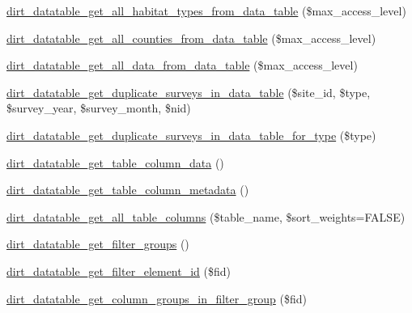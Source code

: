 \begin{DoxyCompactItemize}
\mbox{\hyperlink{dirt__datatable_8search__table__db__ops_8inc_aa00c9db99f16c0b4144b6c5f00eba9d2}{dirt\+\_\+datatable\+\_\+get\+\_\+all\+\_\+habitat\+\_\+types\+\_\+from\+\_\+data\+\_\+table}} (\$max\+\_\+access\+\_\+level)
\item 
\mbox{\hyperlink{dirt__datatable_8search__table__db__ops_8inc_a482930b8659514942ed6dc4e359d0a6d}{dirt\+\_\+datatable\+\_\+get\+\_\+all\+\_\+counties\+\_\+from\+\_\+data\+\_\+table}} (\$max\+\_\+access\+\_\+level)
\item 
\mbox{\hyperlink{dirt__datatable_8search__table__db__ops_8inc_ab27d8da10244a4377319b39414041ba4}{dirt\+\_\+datatable\+\_\+get\+\_\+all\+\_\+data\+\_\+from\+\_\+data\+\_\+table}} (\$max\+\_\+access\+\_\+level)
\item 
\mbox{\hyperlink{dirt__datatable_8search__table__db__ops_8inc_a0e52be5ef573786e8d23a74b558ced30}{dirt\+\_\+datatable\+\_\+get\+\_\+duplicate\+\_\+surveys\+\_\+in\+\_\+data\+\_\+table}} (\$site\+\_\+id, \$type, \$survey\+\_\+year, \$survey\+\_\+month, \$nid)
\item 
\mbox{\hyperlink{dirt__datatable_8search__table__db__ops_8inc_a4b08ea9d0c011776589913330a46c87b}{dirt\+\_\+datatable\+\_\+get\+\_\+duplicate\+\_\+surveys\+\_\+in\+\_\+data\+\_\+table\+\_\+for\+\_\+type}} (\$type)
\item 
\mbox{\hyperlink{dirt__datatable_8search__table__db__ops_8inc_aed6738c9a72fa672a50897f35098b4be}{dirt\+\_\+datatable\+\_\+get\+\_\+table\+\_\+column\+\_\+data}} ()
\item 
\mbox{\hyperlink{dirt__datatable_8search__table__db__ops_8inc_a619f00ed43d79a31e439536bcd6f370a}{dirt\+\_\+datatable\+\_\+get\+\_\+table\+\_\+column\+\_\+metadata}} ()
\item 
\mbox{\hyperlink{dirt__datatable_8search__table__db__ops_8inc_a02cbe06f511d343f4f1fb9c158184a72}{dirt\+\_\+datatable\+\_\+get\+\_\+all\+\_\+table\+\_\+columns}} (\$table\+\_\+name, \$sort\+\_\+weights=F\+A\+L\+SE)
\item 
\mbox{\hyperlink{dirt__datatable_8search__table__db__ops_8inc_ab8aa8cc8b0972f3f4d9ac8ed5b61ede2}{dirt\+\_\+datatable\+\_\+get\+\_\+filter\+\_\+groups}} ()
\item 
\mbox{\hyperlink{dirt__datatable_8search__table__db__ops_8inc_affbfc59ee68da952a55a0efbfe961866}{dirt\+\_\+datatable\+\_\+get\+\_\+filter\+\_\+element\+\_\+id}} (\$fid)
\item 
\mbox{\hyperlink{dirt__datatable_8search__table__db__ops_8inc_a0afe6f766b7c376cfeef67337ce44f3f}{dirt\+\_\+datatable\+\_\+get\+\_\+column\+\_\+groups\+\_\+in\+\_\+filter\+\_\+group}} (\$fid)

\end{DoxyCompactItemize}
